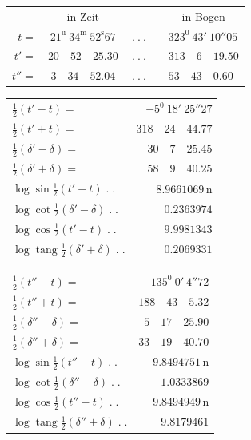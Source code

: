 \begin{center}\small
\begin{tabular}{rcrcl}
&in Zeit&&&\multicolumn{1}{c}{in Bogen}\\
$t=$&$21^{\mathrm u}\ 34^{\mathrm m}\ 52^{\mathrm s}67$&$\ .\ .\ .$&&$323^0\ 43'\ 10''05$\\
$t'=$&$20\quad52\quad25.30$&$\ .\ .\ .$&&$313\quad6\quad19.50$\\
$t''=$&$3\quad34\quad52.04$&$\ .\ .\ .$&&$53\quad43\quad0.60$
\end{tabular}
\par\medskip
\begin{minipage}[t]{.49\textwidth}\centering
\begin{tabular}[t]{@{}lr@{}}
$\tfrac12(t'-t)=$&$-5^0\ 18'\ 25''27$\\
$\tfrac12(t'+t)=$&$318\quad24\quad44.77$\\[6pt]
$\tfrac12(\delta'-\delta)=$&$30\quad7\quad25.45$\\
$\tfrac12(\delta'+\delta)=$&$58\quad9\quad40.25$\\[6pt]
$\log\sin\tfrac12(t'-t)\;.\;.$&$8.9661069\,\mathrm n$\\
$\log\cot\tfrac12(\delta'-\delta)\;.\;.$&$0.2363974$\\[6pt]
$\log\cos\tfrac12(t'-t)\;.\;.$&$9.9981343$\\
$\log\operatorname{tang}\tfrac12(\delta'+\delta)\;.\;.$&$0.2069331$
\end{tabular}
\end{minipage}\hfill
\begin{minipage}[t]{.49\textwidth}\centering
\begin{tabular}[t]{@{}lr@{}}
$\tfrac12(t''-t)=$&$-135^0\ 0'\ 4''72$\\
$\tfrac12(t''+t)=$&$188\quad43\quad5.32$\\[6pt]
$\tfrac12(\delta''-\delta)=$&$5\quad17\quad25.90$\\
$\tfrac12(\delta''+\delta)=$&$33\quad19\quad40.70$\\[6pt]
$\log\sin\tfrac12(t''-t)\;.\;.$&$9.8494751\,\mathrm n$\\
$\log\cot\tfrac12(\delta''-\delta)\;.\;.$&$1.0333869$\\[6pt]
$\log\cos\tfrac12(t''-t)\;.\;.$&$9.8494949\,\mathrm n$\\
$\log\operatorname{tang}\tfrac12(\delta''+\delta)\;.\;.$&$9.8179461$
\end{tabular}
\end{minipage}
\end{center}

